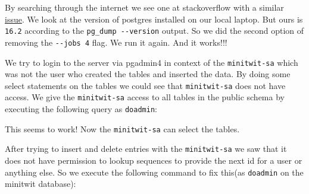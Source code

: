 
By searching through the internet we see one at stackoverflow with a similar \href{https://dba.stackexchange.com/questions/257398/pg-restore-with-jobs-flag-results-in-pg-restore-error-a-worker-process-di}{issue}. We look at the version of postgres installed on our local laptop. But ours is \texttt{16.2} according to the \texttt{pg\_dump\ -\/-version} output. So we did the second option of removing the \texttt{-\/-jobs\ 4} flag. We run it again. And it works!!!

We try to login to the server via pgadmin4 in context of the \texttt{minitwit-sa} which was not the user who created the tables and inserted the data. By doing some select statements on the tables we could see that \texttt{minitwit-sa} does not have access. We give the \texttt{minitwit-sa} access to all tables in the public schema by executing the following query as \texttt{doadmin}:


This seems to work! Now the \texttt{minitwit-sa} can select the tables.

After trying to insert and delete entries with the \texttt{minitwit-sa} we saw that it does not have permission to lookup sequences to provide the next id for a user or anything else. So we execute the following command to fix this(as \texttt{doadmin} on the minitwit database):


